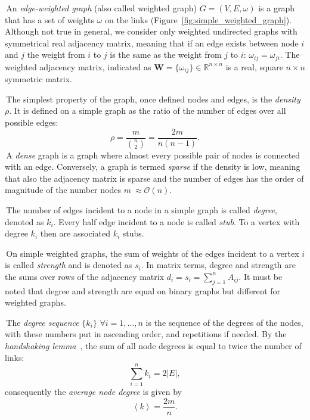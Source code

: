 \noindent\textbullet \,An \emph{edge-weighted graph} (also called weighted graph) $G=(V,E,\omega)$ is a graph that has a set of weights $\omega$ on the links (Figure~\ref{fig:simple_weighted_graph}). Although not true in general, we consider only weighted undirected graphs with symmetrical real adjacency matrix, meaning that if an edge exists between node $i$ and $j$ the weight from $i$ to $j$ is the same as the weight from $j$ to $i$: $\omega_{ij}=\omega_{ji}$. The weighted adjacency matrix,  indicated as $\mathbf{W}=\{ \omega_{ij} \} \in \mathbb{R}^{n\times n}$ is a real, square $n \times n$ symmetric matrix.

\noindent\textbullet \,The simplest property of the graph, once defined nodes and edges, is the \emph{density} $\rho$. It is defined on a simple graph as the ratio of the number of edges over all possible edges:
\begin{equation}
\rho = \frac{m}{\binom{n}{2}} = \frac{2m}{n(n-1)}.
\end{equation}
\noindent\textbullet \,A \emph{dense} graph is a graph where almost every possible pair of nodes is connected with an edge. Conversely, a graph is termed \emph{sparse} if the density is low, meaning that also the adjacency matrix is sparse and the number of edges has the order of magnitude of the number nodes $m ~\approx \mathcal{O}(n)$.

\noindent\textbullet \,The number of edges incident to a node in a simple graph is called \emph{degree}, denoted as $k_i$. Every half edge incident to a node is called \emph{stub}. To a vertex with degree $k_i$ then are associated $k_i$ stubs.

\noindent\textbullet \,On simple weighted graphs, the sum of weights of the edges incident to a vertex $i$ is called \emph{strength} and is denoted as $s_i$. 
In matrix terms, degree and strength are the sums over rows of the adjacency matrix $d_i=s_i=\sum_{j=1}^n A_{ij}$. It must be noted that degree and strength are equal on binary graphs but different for weighted graphs.

\noindent\textbullet \,The \emph{degree sequence} $\{k_i\}$ $\forall i=1,\ldots,n$ is the sequence  of the degrees of the nodes, with these numbers put in ascending order, and repetitions if needed. By the \emph{handshaking lemma}~\cite{leiserson2001}, the sum of all node degrees is equal to twice the number of links:
\begin{equation}
\label{eq:handshaking_lemma}
\sum_{i=1}^n k_i=2 |E|,
\end{equation}
consequently the \emph{average node degree} is given by
\begin{equation}
\left< k \right> = \frac{2m}{n}.
\end{equation}

